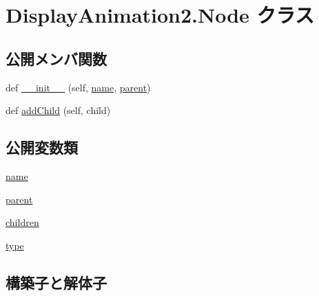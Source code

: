 \hypertarget{class_display_animation2_1_1_node}{}\section{Display\+Animation2.\+Node クラス}
\label{class_display_animation2_1_1_node}
\subsection*{公開メンバ関数}
\begin{DoxyCompactItemize}
\item 
def \hyperlink{class_display_animation2_1_1_node_ad420891150d768076504b0fce0051e0b}{\+\_\+\+\_\+init\+\_\+\+\_\+} (self, \hyperlink{class_display_animation2_1_1_node_aa080d84c16a91cb0e51732e6b948afab}{name}, \hyperlink{class_display_animation2_1_1_node_a3e3f09ee929fe128982780a4f9a76605}{parent})
\item 
def \hyperlink{class_display_animation2_1_1_node_aaa664ef0daca912d1605e0594a37fb6a}{add\+Child} (self, child)
\end{DoxyCompactItemize}
\subsection*{公開変数類}
\begin{DoxyCompactItemize}
\item 
\hyperlink{class_display_animation2_1_1_node_aa080d84c16a91cb0e51732e6b948afab}{name}
\item 
\hyperlink{class_display_animation2_1_1_node_a3e3f09ee929fe128982780a4f9a76605}{parent}
\item 
\hyperlink{class_display_animation2_1_1_node_a57cd872d07e5e508218d403f5ba0b9ca}{children}
\item 
\hyperlink{class_display_animation2_1_1_node_a87ff03cb02c4a57606c0b53aa9798e60}{type}
\end{DoxyCompactItemize}


\subsection{構築子と解体子}
\mbox{\label{class_display_animation2_1_1_node_ad420891150d768076504b0fce0051e0b}} 
